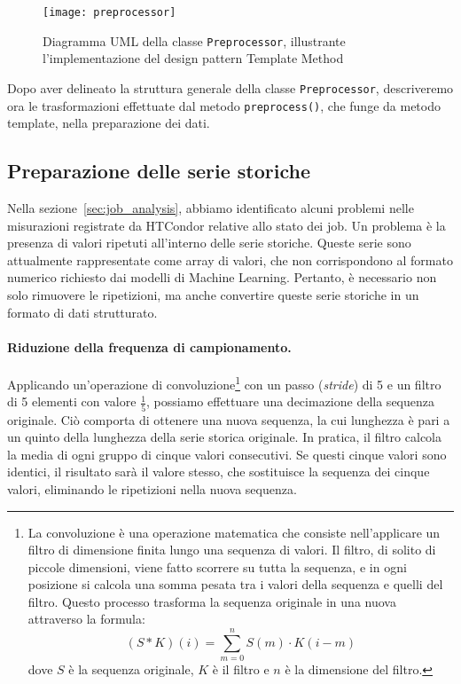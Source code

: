 \begin{figure}[!ht]
   \centering
   \texttt{[image: preprocessor]}
   \caption{Diagramma UML della classe \texttt{Preprocessor}, illustrante
   l'implementazione del design pattern Template Method}
   \label{fig:uml_preprocessor}
\end{figure}

Dopo aver delineato la struttura generale della classe \texttt{Preprocessor},
descriveremo ora le trasformazioni effettuate dal metodo
\texttt{preprocess()}, che funge da metodo template, nella preparazione dei
dati.

\subsection{Preparazione delle serie storiche}

Nella sezione~\ref{sec:job_analysis}, abbiamo identificato alcuni problemi
nelle misurazioni registrate da HTCondor relative allo stato dei job. Un
problema è la presenza di valori ripetuti all'interno delle serie storiche.
Queste serie sono attualmente rappresentate come array di valori, che non
corrispondono al formato numerico richiesto dai modelli di Machine Learning.
Pertanto, è necessario non solo rimuovere le ripetizioni, ma anche convertire
queste serie storiche in un formato di dati strutturato.

\paragraph{Riduzione della frequenza di campionamento.} Applicando
un'operazione di convoluzione\footnote{La convoluzione è una operazione
    matematica che consiste nell'applicare un filtro di dimensione finita
    lungo una sequenza di valori. Il filtro, di solito di piccole dimensioni,
    viene fatto scorrere su tutta la sequenza, e in ogni posizione si calcola
    una somma pesata tra i valori della sequenza e quelli del filtro. Questo
    processo trasforma la sequenza originale in una nuova attraverso la
formula: $$(S\ast K)(i)=\displaystyle\sum_{m=0}^{n}S(m)\cdot K(i-m)$$ dove
$S$ è la sequenza originale, $K$ è il filtro e $n$ è la dimensione del
filtro.} con un passo (\textit{stride}) di 5 e un filtro di 5 elementi con
valore $\frac{1}{5}$, possiamo effettuare una decimazione della sequenza
originale. Ciò comporta di ottenere una nuova sequenza, la cui lunghezza è
pari a un quinto della lunghezza della serie storica originale. In pratica, il
filtro calcola la media di ogni gruppo di cinque valori consecutivi. Se questi
cinque valori sono identici, il risultato sarà il valore stesso, che
sostituisce la sequenza dei cinque valori, eliminando le ripetizioni nella
nuova sequenza.

